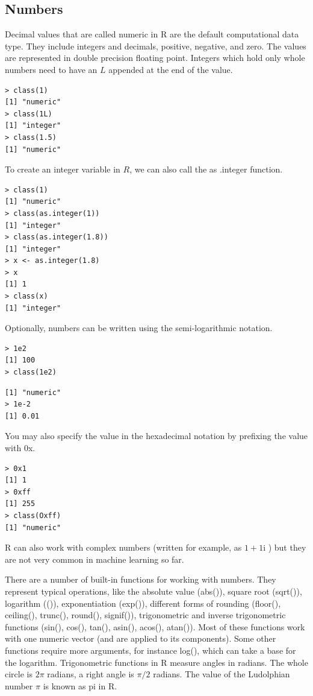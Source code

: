 \documentclass[11pt,openany,executivepaper]{book}
\begin{document}
\subsection{Numbers}
Decimal values that are called numeric in R are the default computational data type. They include integers and decimals, positive, negative, and zero. The values are represented in double precision floating point. Integers which hold only whole numbers need to have an $L$ appended at the end of the value.

\begin{verbatim}
> class(1)
[1] "numeric"
> class(1L)
[1] "integer"
> class(1.5)
[1] "numeric"
\end{verbatim}

To create an integer variable in $R$, we can also call the as .integer function.

\begin{verbatim}
> class(1)
[1] "numeric"
> class(as.integer(1))
[1] "integer"
> class(as.integer(1.8))
[1] "integer"
> x <- as.integer(1.8)
> x
[1] 1
> class(x)
[1] "integer"
\end{verbatim}

Optionally, numbers can be written using the semi-logarithmic notation.

\begin{verbatim}
> 1e2
[1] 100
> class(1e2)
\end{verbatim}

\begin{verbatim}
[1] "numeric"
> 1e-2
[1] 0.01
\end{verbatim}

You may also specify the value in the hexadecimal notation by prefixing the value with 0x.

\begin{verbatim}
> 0x1
[1] 1
> 0xff
[1] 255
> class(Oxff)
[1] "numeric"
\end{verbatim}

R can also work with complex numbers (written for example, as $1+1 \mathrm{i}$ ) but they are not very common in machine learning so far.

There are a number of built-in functions for working with numbers. They represent typical operations, like the absolute value (abs()), square root (sq\-rt()), logarithm (()), exponentiation (exp()), different forms of rounding (flo\-or(), ceiling(), trunc(), round(), signif()), trigonometric and inverse trigonometric functions (sin(), cos(), tan(), asin(), acos(), atan()). Most of these functions work with one numeric vector (and are applied to its components). Some other functions require more arguments, for instance log(), which can take a base for the logarithm. Trigonometric functions in R measure angles in radians. The whole circle is $2\pi$ radians, a right angle is $\pi/2$ radians. The value of the Ludolphian number $\pi$ is known as pi in R.
\end{document}
